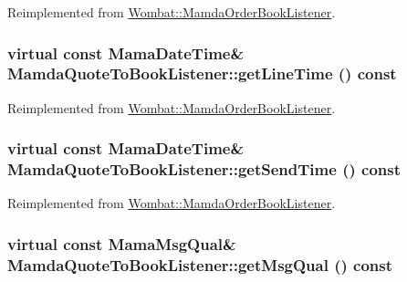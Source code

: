 Reimplemented from \hyperlink{classWombat_1_1MamdaOrderBookListener_d696de0b8a7d04c239f813163c9f63b9}{Wombat::Mamda\-Order\-Book\-Listener}.\hypertarget{classMamdaQuoteToBookListener_e6897c75c5d12dc67f573946499506b3}{
\subsubsection[getLineTime]{\setlength{\rightskip}{0pt plus 5cm}virtual const Mama\-Date\-Time\& Mamda\-Quote\-To\-Book\-Listener::get\-Line\-Time () const}}
\label{classMamdaQuoteToBookListener_e6897c75c5d12dc67f573946499506b3}




Reimplemented from \hyperlink{classWombat_1_1MamdaOrderBookListener_5c765d829c1eca59880839fe360b4497}{Wombat::Mamda\-Order\-Book\-Listener}.\hypertarget{classMamdaQuoteToBookListener_f36e8e40182ebe8d6e1c2d5445e0590e}{
\subsubsection[getSendTime]{\setlength{\rightskip}{0pt plus 5cm}virtual const Mama\-Date\-Time\& Mamda\-Quote\-To\-Book\-Listener::get\-Send\-Time () const}}
\label{classMamdaQuoteToBookListener_f36e8e40182ebe8d6e1c2d5445e0590e}




Reimplemented from \hyperlink{classWombat_1_1MamdaOrderBookListener_244f7440a5a3f0bb81419cae5718ddd8}{Wombat::Mamda\-Order\-Book\-Listener}.\hypertarget{classMamdaQuoteToBookListener_78bc7b821c48a99ecdff7f959763f7e2}{
\subsubsection[getMsgQual]{\setlength{\rightskip}{0pt plus 5cm}virtual const Mama\-Msg\-Qual\& Mamda\-Quote\-To\-Book\-Listener::get\-Msg\-Qual () const}}
\label{classMamdaQuoteToBookListener_78bc7b821c48a99ecdff7f959763f7e2}




